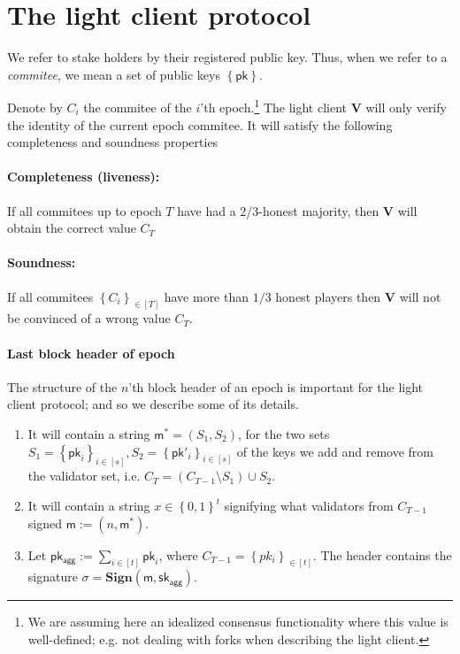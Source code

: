 \documentclass[11pt]{article}
\numberwithin{figure}{section} %
\newcommand{\set}[1]{\ensuremath{\left\{#1\right\}}\xspace}
\newcommand{\defeq}{:=}
\newcommand{\B}{\ensuremath{\set{0,1}}\xspace}
\newcommand{\sett}[2]{\ensuremath{\set{#1}_{#2}}\xspace}
\newcommand{\msg}{\ensuremath{\mathsf{m}}\xspace}
\newcommand{\pk}{\ensuremath{\mathsf{pk}}\xspace}
\newcommand{\pkagg}{\ensuremath{\mathsf{pk_{agg}}}\xspace}
\newcommand{\skagg}{\ensuremath{\mathsf{sk_{agg}}}\xspace}
\newcommand{\sign}{\ensuremath{\mathbf{Sign}}\xspace}
\newcommand{\ver}{\ensuremath{\mathsf{\mathbf{V}}}\xspace}
\newcommand{\sig}{\ensuremath{\sigma}\xspace}
\begin{document}
\section{The light client protocol}
We refer to stake holders by their registered public key.
Thus, when we refer to a \emph{commitee}, we mean a set of public keys \set{\pk}.




Denote by $C_i$ the commitee of the $i$'th epoch.\footnote{We are assuming here an idealized consensus functionality where this value is well-defined; e.g. not dealing with forks when describing the light client.}
The light client \ver will only verify the identity of the current epoch commitee.
It will satisfy the following completeness and soundness properties

\paragraph{Completeness (liveness):}
If all commitees up to epoch $T$ have had a 2/3-honest majority, then
\ver will obtain the correct value $C_T$
\paragraph{Soundness:} If all commitees $\sett{C_i}{\in [T]}$ have more than $1/3$ honest players then \ver will not be convinced of a wrong value $C_T$.

\paragraph{Last block header of epoch}
The structure of the $n$'th block header of an epoch is important for the light client protocol;
and so we describe some of its details.
\begin{enumerate}
 \item It will contain a string $\msg^* = (S_1,S_2)$, for the two sets $S_1=\sett{\pk_i}{i\in [s]},S_2=\sett{\pk'_i}{i\in [s]}$ of the keys we add and remove from the validator set, i.e. $C_{T} = (C_{T-1}\setminus S_1)\cup S_2$.
 \item It will contain a string $x\in \B^t$ signifying what validators from $C_{T-1}$ signed $\msg\defeq (n,\msg^*)$.
 \item Let $\pkagg \defeq \sum_{i\in [t]} \pk_i$, where $C_{T-1} = \sett{pk_i}{\in [t]}$.
 The header contains the signature $\sig = \sign(\msg,\skagg)$.
 \end{enumerate}
\end{document}
